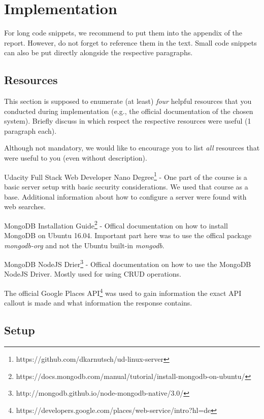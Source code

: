 \newpage
\section{Implementation}

For long code snippets, we recommend to put them into the appendix of the
report. However, do not forget to reference them in the text. Small code
snippets can also be put directly alongside the respective paragraphs.

\subsection{Resources}

This section is supposed to enumerate (at least) \emph{four} helpful resources
that you conducted during implementation (e.g., the official documentation of
the chosen system). Briefly discuss in which respect the respective resources
were useful (1 paragraph each).

Although not mandatory, we would like to encourage you to list \emph{all}
resources that were useful to you (even without description).

\begin{packed_enum}
   \item Udacity Full Stack Web Developer Nano Degree\footnote{https://github.com/dkarnutsch/ud-linux-server} - One part of the course is a basic server setup with basic security considerations. We used that course as a base. Additional information about how to configure a server were found with web searches.  
   \item MongoDB Installation Guide\footnote{https://docs.mongodb.com/manual/tutorial/install-mongodb-on-ubuntu/} - Offical documentation on how to install MongoDB on Ubuntu 16.04. Important part here was to use the offical package \textit{mongodb-org} and not the Ubuntu built-in \textit{mongodb}. 
   \item MongoDB NodeJS Drier\footnote{http://mongodb.github.io/node-mongodb-native/3.0/} - Offical documentation on how to use the MongoDB NodeJS Driver. Mostly used for using CRUD operations. 
   \item The official Google Places API\footnote{https://developers.google.com/places/web-service/intro?hl=de} was used to gain information the exact API callout is made and what information the response contains.
\end{packed_enum}

\subsection{Setup}

